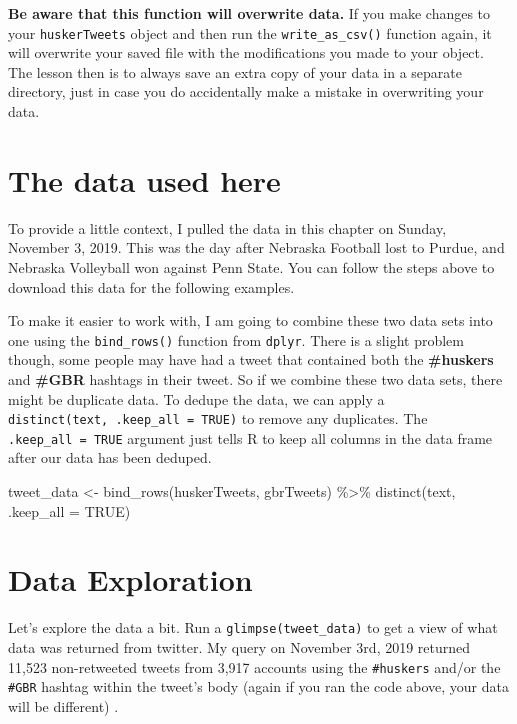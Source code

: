 \documentclass[
]{book}
\newenvironment{Shaded}{\begin{snugshade}}{\end{snugshade}}
\newcommand{\AttributeTok}[1]{\textcolor[rgb]{0.77,0.63,0.00}{#1}}
\newcommand{\ConstantTok}[1]{\textcolor[rgb]{0.00,0.00,0.00}{#1}}
\newcommand{\FunctionTok}[1]{\textcolor[rgb]{0.00,0.00,0.00}{#1}}
\newcommand{\NormalTok}[1]{#1}
\newcommand{\OtherTok}[1]{\textcolor[rgb]{0.56,0.35,0.01}{#1}}
\newcommand{\SpecialCharTok}[1]{\textcolor[rgb]{0.00,0.00,0.00}{#1}}
\begin{document}
\textbf{Be aware that this function will overwrite data.} If you make changes to your \texttt{huskerTweets} object and then run the \texttt{write\_as\_csv()} function again, it will overwrite your saved file with the modifications you made to your object. The lesson then is to always save an extra copy of your data in a separate directory, just in case you do accidentally make a mistake in overwriting your data.

\hypertarget{the-data-used-here}{%
\section{The data used here}\label{the-data-used-here}}

To provide a little context, I pulled the data in this chapter on Sunday, November 3, 2019. This was the day after Nebraska Football lost to Purdue, and Nebraska Volleyball won against Penn State. You can follow the steps above to download this data for the following examples.

To make it easier to work with, I am going to combine these two data sets into one using the \texttt{bind\_rows()} function from \texttt{dplyr}. There is a slight problem though, some people may have had a tweet that contained both the \textbf{\#huskers} and \textbf{\#GBR} hashtags in their tweet. So if we combine these two data sets, there might be duplicate data. To dedupe the data, we can apply a \texttt{distinct(text,\ .keep\_all\ =\ TRUE)} to remove any duplicates. The \texttt{.keep\_all\ =\ TRUE} argument just tells R to keep all columns in the data frame after our data has been deduped.

\begin{Shaded}
\begin{Highlighting}[]
\NormalTok{tweet\_data }\OtherTok{\textless{}{-}} \FunctionTok{bind\_rows}\NormalTok{(huskerTweets, gbrTweets) }\SpecialCharTok{\%\textgreater{}\%} 
  \FunctionTok{distinct}\NormalTok{(text, }\AttributeTok{.keep\_all =} \ConstantTok{TRUE}\NormalTok{)}
\end{Highlighting}
\end{Shaded}

\hypertarget{data-exploration}{%
\section{Data Exploration}\label{data-exploration}}

Let's explore the data a bit. Run a \texttt{glimpse(tweet\_data)} to get a view of what data was returned from twitter. My query on November 3rd, 2019 returned 11,523 non-retweeted tweets from 3,917 accounts using the \texttt{\#huskers} and/or the \texttt{\#GBR} hashtag within the tweet's body (again if you ran the code above, your data will be different) .
\end{document}
